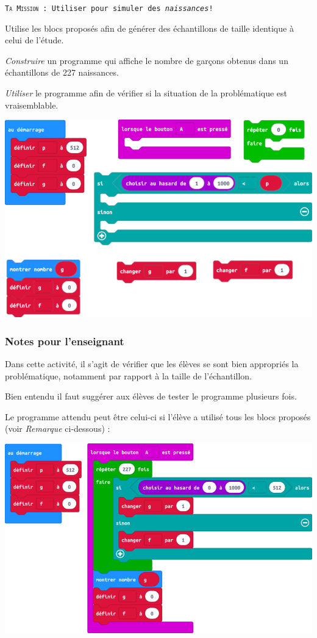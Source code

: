 \begin{eleve}    
    \texttt{\textsc{Ta Mission} : Utiliser \mb pour simuler des \emph{naissances}!}
    
    Utilise les blocs proposés afin de générer des échantillons de taille identique à celui de l'étude.
    
    \emph{Construire} un programme qui affiche le nombre de garçons obtenus dans un échantillons de 227 naissances.
    
    \emph{Utiliser} le programme afin de vérifier si la situation de la problématique est vraisemblable.
    
    \includegraphics[width=0.8\linewidth]{res/mb-fluctuation-activite2-blocs.png}
    
\end{eleve}

\newpage

\subsubsection{Notes pour l'enseignant}

%
%
\begin{methode}
Dans cette activité, il s'agit de vérifier que les élèves se sont bien appropriés la problématique, notamment par rapport à la taille de l'échantillon.

Bien entendu il faut suggérer aux élèves de tester le programme plusieurs fois.

Le programme attendu peut être celui-ci si l'élève a utilisé tous les blocs proposés (voir \emph{Remarque} ci-dessous) :

    \includegraphics[width=0.8\linewidth]{res/mb-fluctuation-activite2-proposition.png}

\end{methode}


